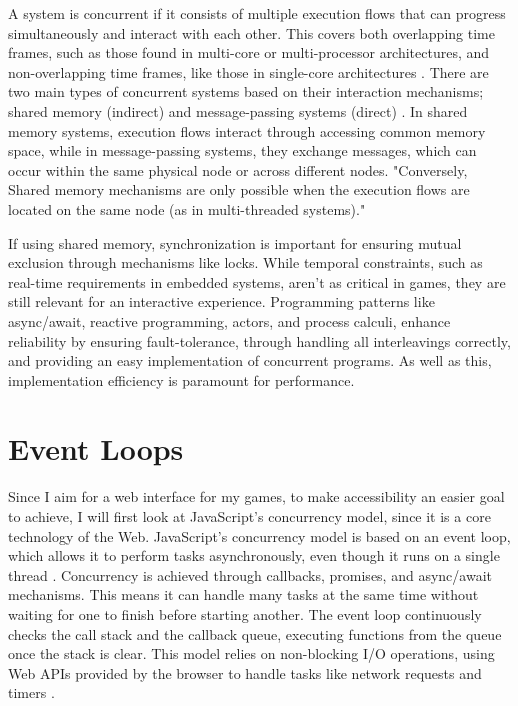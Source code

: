 \documentclass[]{final}
\begin{document}
A system is concurrent if it consists of multiple execution flows that
can progress simultaneously and interact with each other.
This covers both overlapping time frames, such as those found
in multi-core or multi-processor architectures, and non-overlapping
time frames, like those in single-core architectures \cite{bianchi_survey_2018}.
There are two main types of concurrent systems based on their interaction
mechanisms; shared memory (indirect) and message-passing systems (direct) \cite{bianchi_survey_2018}.
In shared memory systems, execution flows interact through accessing
common memory space, while in message-passing systems,
they exchange messages, which can occur within the same physical
node or across different nodes. "Conversely, Shared memory mechanisms
are only possible when the execution flows are
located on the same node (as in multi-threaded systems)."\cite{bianchi_survey_2018}

If using shared memory, synchronization is important
for ensuring mutual exclusion through mechanisms like locks.
While temporal constraints, such as real-time requirements in embedded systems,
aren't as critical in games, they are still relevant for an interactive
experience. Programming patterns like async/await, reactive programming,
actors, and process calculi, enhance reliability by ensuring fault-tolerance,
through handling all interleavings correctly,
and providing an easy implementation of concurrent programs. As well as this, implementation efficiency
is paramount for performance.

\section{Event Loops}
Since I aim for a web interface for my games, to make
accessibility an easier goal to achieve, I will first look at JavaScript's
concurrency model, since it is a core technology of the Web.
JavaScript's concurrency model is based on an event loop, which allows it to
perform tasks asynchronously, even though it runs on a single thread \cite{zhao_concurrency_2021}.
Concurrency is achieved through callbacks, promises, and
async/await mechanisms. This means it can handle many tasks at the same time without waiting for one
to finish before starting another. The event loop continuously checks the call
stack and the callback queue, executing functions from the queue once
the stack is clear. This model relies on non-blocking I/O operations,
using Web APIs provided by the browser to handle tasks like network
requests and timers \cite{noauthor_event_2024}.
\end{document}

